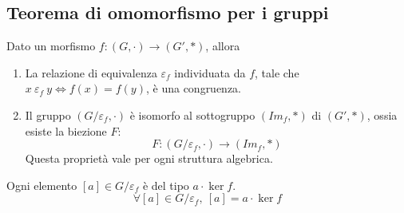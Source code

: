 
\subsection{Teorema di omomorfismo per i gruppi}

\begin{theorem}
Dato un morfismo $f : (G, \cdot) \to (G', \ast)$, allora 
\begin{enumerate}
    \item La relazione di equivalenza $\varepsilon_f$ individuata da $f$, tale che $x \ \varepsilon_f \ y \iff f(x) = f(y)$, \`e una congruenza.
    \item Il gruppo $(G / \varepsilon_f, \cdot)$ \`e isomorfo al sottogruppo $(Im_f, \ast)$ di $(G', \ast)$, ossia esiste la biezione $F$:
    \[
    F : (G / \varepsilon_f, \cdot) \to (Im_f, \ast)
    \]
    Questa propriet\`a vale per ogni struttura algebrica.
\end{enumerate}
Ogni elemento $[a] \in G / \varepsilon_f$ \`e del tipo $a \cdot \ker f$.
\[
\forall [a] \in G / \varepsilon_f , \ [a] = a \cdot \ker f
\]
\end{theorem}

